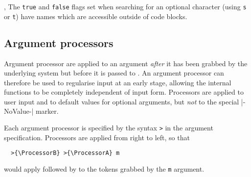 \documentclass{l3doc}
\begin{document}
\begin{variable}{\BooleanFalse, \BooleanTrue}
  The \texttt{true} and \texttt{false} flags set when searching for
  an optional character (using \texttt{s} or \texttt{t}) have
  names which are accessible outside of code blocks.
\end{variable}


\subsection{Argument processors}
\label{sec:cmd:processors}

Argument processor are applied to an argument \emph{after} it has been grabbed
by the underlying system but before it is passed to . An argument
processor can therefore be used to regularise input at an early stage, allowing
the internal functions to be completely independent of input form. Processors
are applied to user input and to default values for optional arguments, but
\emph{not} to the special |-NoValue-| marker.

Each argument processor is specified by the syntax \texttt{>}
in the argument specification. Processors are applied from right to left, so
that
\begin{verbatim}
  >{\ProcessorB} >{\ProcessorA} m
\end{verbatim}
would apply  followed by  to the tokens grabbed
by the \texttt{m} argument.
\end{document}
